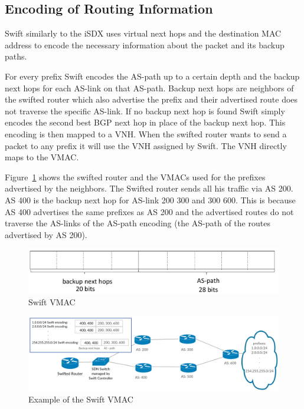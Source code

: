 \newpage

\subsection{\label{chapter2:Swift:encoding_of_routing_information}Encoding of Routing Information}
Swift similarly to the iSDX uses virtual next hops and the destination MAC address to encode the necessary information about the packet and its backup paths.

For every prefix Swift encodes the AS-path up to a certain depth and the backup next hops for each AS-link on that AS-path. Backup next hops are neighbors of the swifted router which also advertise the prefix and their advertised route does not traverse the specific AS-link. If no backup next hop is found Swift simply encodes the second best BGP next hop in place of the backup next hop. This encoding is then mapped to a VNH. When the swifted router wants to send a packet to any prefix it will use the VNH assigned by Swift. The VNH directly maps to the VMAC. 

Figure~\ref{fig:swift_vmac} shows the swifted router and the VMACs used for the prefixes advertised by the neighbors. The Swifted router sends all his traffic via AS 200. AS 400 is the backup next hop for AS-link 200 300 and 300 600. This is because AS 400 advertises the same prefixes as AS 200 and the advertised routes do not traverse the AS-links of the AS-path encoding (the AS-path of the routes advertised by AS 200).

\begin{figure}[h]
\center
\includegraphics[scale = 0.6]{Figures/swift_vmac3_cropped.pdf}
\caption{Swift VMAC}
\end{figure}


\begin{figure}[h]
\center
\includegraphics[scale = 0.24]{Figures/bckgrnd_swift_topology.pdf}
\caption{Example of the Swift VMAC}
\label{fig:swift_vmac}
\end{figure}








